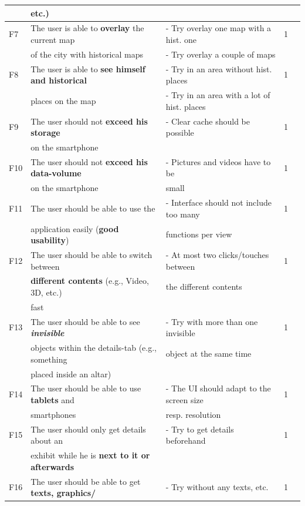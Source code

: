 {\begin{landscape}
\begin{center}
\begin{longtable}{|l|l|lll|}
		& etc.)										&	& \\
	\hline
	F7 & The user is able to \textbf{overlay} the current map  	& - Try overlay one map with a hist. one & 1\\
		& of the city with historical maps					& - Try overlay a couple of maps	& \\
	\hline
	F8 & The user is able to \textbf{see himself and historical} 	& - Try in an area without hist. places  	& 1\\
		& places on the map 							& - Try in an area with a lot of hist. places	&  \\
	\hline
	F9 & The user should not \textbf{exceed his storage} 		& - Clear cache should be possible  	& 1\\
		& on the smartphone							&	& \\
	\hline
	F10 & The user should not \textbf{exceed his data-volume} 	& - Pictures and videos have to be   	& 1\\
		& on the smartphone							& small	& \\
	\hline
	F11 & The user should be able to use the  				&  - Interface should not include too many 	& 1\\
		& application easily (\textbf{good usability})			& functions per view 	& \\
		F12 & The user should be able to switch between 			& - At most two clicks/touches between  	& 1\\
		& \textbf{different contents} (e.g., Video, 3D, etc.)		& the different contents	& \\
		& fast										&	& \\
	\hline
	F13 & The user should be able to see \textbf{\textit{invisible}} 	& - Try with more than one invisible 	& 1\\
		& objects within the details-tab (e.g., something			& object at the same time	& \\
		& placed inside an altar)								&	& \\
	\hline
	F14 & The user should be able to use \textbf{tablets} and 		& - The UI should adapt to the screen size  	& 1\\
		& smartphones									& resp. resolution	& \\
	\hline
	F15 & The user should only get details about an  				& - Try to get details beforehand & 1\\
		& exhibit while he is \textbf{next to it or afterwards} 		&	& \\
	\hline
	F16 & The user should be able to get \textbf{texts, graphics/}  	& - Try without any texts, etc.  & 1\\

\end{longtable}
\end{center}
\end{landscape}}
